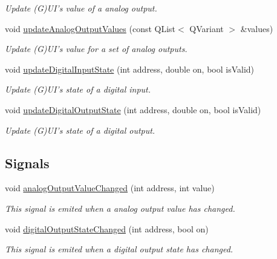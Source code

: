 \begin{DoxyCompactItemize}
\begin{DoxyCompactList}\small\item\em Update (G)UI's value of a analog output. \end{DoxyCompactList}\item 
void \hyperlink{classmdt_device_ios_a2c40cf4749cff1ade292bdd81bc195e9}{updateAnalogOutputValues} (const QList$<$ QVariant $>$ \&values)
\begin{DoxyCompactList}\small\item\em Update (G)UI's value for a set of analog outputs. \end{DoxyCompactList}\item 
void \hyperlink{classmdt_device_ios_a1ce6f74fbcc8d2a72c64ea76ee4d1aea}{updateDigitalInputState} (int address, double on, bool isValid)
\begin{DoxyCompactList}\small\item\em Update (G)UI's state of a digital input. \end{DoxyCompactList}\item 
void \hyperlink{classmdt_device_ios_a6407c4a5dfbc40937cf3f4d37345e825}{updateDigitalOutputState} (int address, double on, bool isValid)
\begin{DoxyCompactList}\small\item\em Update (G)UI's state of a digital output. \end{DoxyCompactList}\end{DoxyCompactItemize}
\subsection*{Signals}
\begin{DoxyCompactItemize}
\item 
void \hyperlink{classmdt_device_ios_a277b53a8cfc28540b5f6dc8684bd5637}{analogOutputValueChanged} (int address, int value)
\begin{DoxyCompactList}\small\item\em This signal is emited when a analog output value has changed. \end{DoxyCompactList}\item 
void \hyperlink{classmdt_device_ios_a6f2647e97f836f1ff184816172a46283}{digitalOutputStateChanged} (int address, bool on)
\begin{DoxyCompactList}\small\item\em This signal is emited when a digital output state has changed. \end{DoxyCompactList}\end{DoxyCompactItemize}
